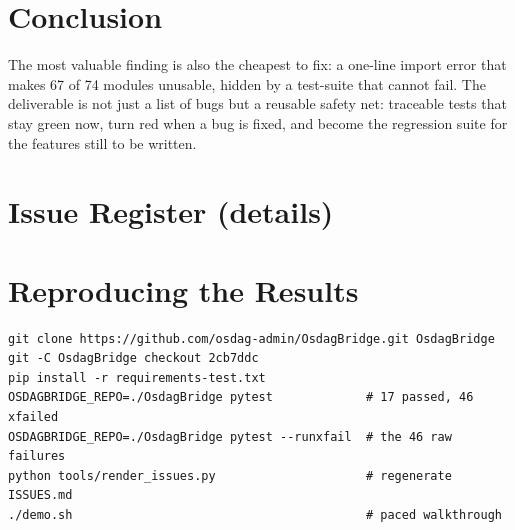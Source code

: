 \documentclass[11pt,a4paper]{report}
\begin{document}
\chapter{Conclusion}
The most valuable finding is also the cheapest to fix: a one-line import error that makes 67 of 74 modules unusable,
hidden by a test-suite that cannot fail. The deliverable is not just a list of bugs but a reusable safety net: \ntests{}
traceable tests that stay green now, turn red when a bug is fixed, and become the regression suite for the features
still to be written.

\appendix
\chapter{Issue Register (details)}\label{app:issues}
\small

\normalsize

\chapter{Reproducing the Results}
\begin{lstlisting}
git clone https://github.com/osdag-admin/OsdagBridge.git OsdagBridge
git -C OsdagBridge checkout 2cb7ddc
pip install -r requirements-test.txt
OSDAGBRIDGE_REPO=./OsdagBridge pytest             # 17 passed, 46 xfailed
OSDAGBRIDGE_REPO=./OsdagBridge pytest --runxfail  # the 46 raw failures
python tools/render_issues.py                     # regenerate ISSUES.md
./demo.sh                                         # paced walkthrough
\end{lstlisting}
\end{document}

